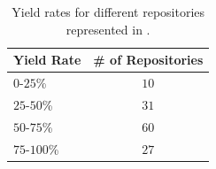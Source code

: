 \begin{table}[ht]
    \centering
    \begin{tabular}{l|c}
\toprule
Yield Rate & \# of Repositories \\
\midrule
$0$-$25$\%   & $10$  \\
$25$-$50$\%  & $31$ \\
$50$-$75$\%  & $60$ \\
$75$-$100$\% & $27$ \\
\bottomrule
    \end{tabular}
    \caption{
    Yield rates for different repositories represented in \bugs{}.
    }
    \label{tab:per_repo_yield_rate}
\end{table}